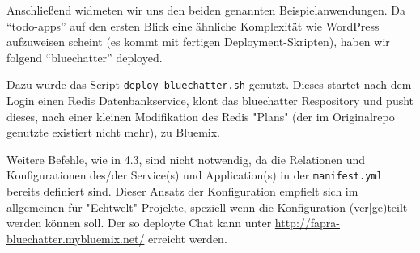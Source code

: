 Anschließend widmeten wir uns den beiden genannten Beispielanwendungen.
Da \enquote{todo-apps} auf den ersten Blick eine ähnliche Komplexität wie WordPress aufzuweisen scheint (es kommt mit fertigen Deployment-Skripten), haben wir folgend \enquote{bluechatter} deployed.

Dazu wurde das Script \texttt{deploy-bluechatter.sh} genutzt.
Dieses startet nach dem Login einen Redis Datenbankservice, klont das bluechatter Respository und pusht dieses, nach einer kleinen Modifikation des Redis "Plans" (der im Originalrepo genutzte existiert nicht mehr), zu Bluemix.

Weitere Befehle, wie in 4.3, sind nicht notwendig, da die Relationen und Konfigurationen des/der Service(s) und Application(s) in der \texttt{manifest.yml} bereits definiert sind.
Dieser Ansatz der Konfiguration empfielt sich im allgemeinen für "Echtwelt"-Projekte, speziell wenn die Konfiguration (ver|ge)teilt werden können soll. Der so deployte Chat kann unter \url{http://fapra-bluechatter.mybluemix.net/} erreicht werden.

